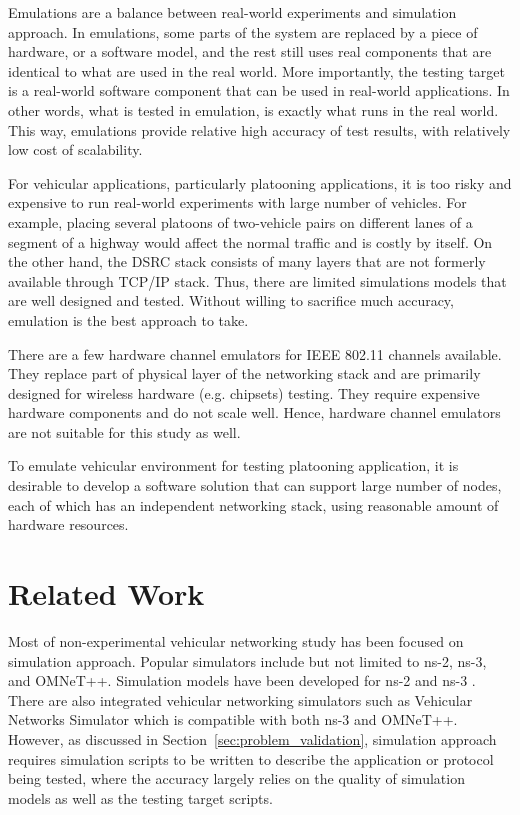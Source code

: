 \documentclass[12pt]{report}
\begin{document}
Emulations are a balance between real-world experiments and simulation approach. In emulations, some parts of the system are replaced by a piece of hardware, or a software model, and the rest still uses real components that are identical to what are used in the real world. More importantly, the testing target is a real-world software component that can be used in real-world applications. In other words, what is tested in emulation, is exactly what runs in the real world. This way, emulations provide relative high accuracy of test results, with relatively low cost of scalability.

For vehicular applications, particularly platooning applications, it is too risky and expensive to run real-world experiments with large number of vehicles. For example, placing several platoons of two-vehicle pairs on different lanes of a segment of a highway would affect the normal traffic and is costly by itself. On the other hand, the DSRC stack consists of many layers that are not formerly available through TCP/IP stack. Thus, there are limited simulations models that are well designed and tested. Without willing to sacrifice much accuracy, emulation is the best approach to take.

There are a few hardware channel emulators for IEEE 802.11 channels available. They replace part of physical layer of the networking stack and are primarily designed for wireless hardware (e.g. chipsets) testing. They require expensive hardware components and do not scale well. Hence, hardware channel emulators are not suitable for this study as well.

To emulate vehicular environment for testing platooning application, it is desirable to develop a software solution that can support large number of nodes, each of which has an independent networking stack, using reasonable amount of hardware resources.


\section{Related Work}

Most of non-experimental vehicular networking study has been focused on simulation approach. Popular simulators include but not limited to ns-2, ns-3\cite{henderson2008network}, and OMNeT++\cite{varga2008overview}. Simulation models have been developed for ns-2 \cite{Chen2006ns2} and ns-3 \cite{Arbabi2010ns3,benin2012ns3}. There are also integrated vehicular networking simulators such as Vehicular Networks Simulator \cite{fernandes2012} which is compatible with both ns-3 and OMNeT++. However, as discussed in Section~\ref{sec:problem_validation}, simulation approach requires simulation scripts to be written to describe the application or protocol being tested, where the accuracy largely relies on the quality of simulation models as well as the testing target scripts.
\end{document}
